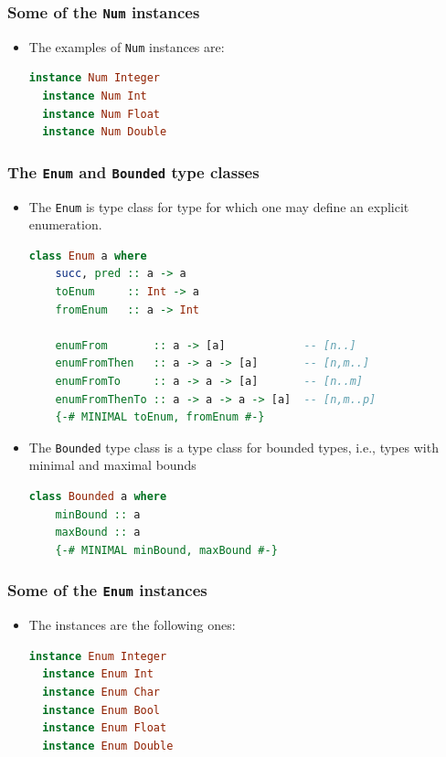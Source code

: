 \documentclass[10pt,pdf,utf8,russian,aspectratio=169]{beamer}
\begin{document}
\begin{frame}[fragile]
  \frametitle{Some of the \verb"Num" instances}

\begin{itemize}
\item The examples of \verb"Num" instances are:

\begin{lstlisting}[language=Haskell]
  instance Num Integer
  instance Num Int
  instance Num Float
  instance Num Double
\end{lstlisting}
\end{itemize}
\end{frame}

\begin{frame}[fragile]
  \frametitle{The \verb"Enum" and \verb"Bounded" type classes}

\begin{itemize}
  \item The \verb"Enum" is type class for type for which one may define an explicit enumeration.
\begin{lstlisting}[language=Haskell]
  class Enum a where
    succ, pred :: a -> a
    toEnum     :: Int -> a
    fromEnum   :: a -> Int

    enumFrom       :: a -> [a]            -- [n..]
    enumFromThen   :: a -> a -> [a]       -- [n,m..]
    enumFromTo     :: a -> a -> [a]       -- [n..m]
    enumFromThenTo :: a -> a -> a -> [a]  -- [n,m..p]
    {-# MINIMAL toEnum, fromEnum #-}
  \end{lstlisting}

\item The \verb"Bounded" type class is a type class for bounded types, i.e., types with minimal and maximal bounds
\begin{lstlisting}[language=Haskell]
  class Bounded a where
    minBound :: a
    maxBound :: a
    {-# MINIMAL minBound, maxBound #-}
  \end{lstlisting}
\end{itemize}
\end{frame}

\begin{frame}[fragile]
  \frametitle{Some of the \verb"Enum" instances}

\begin{itemize}
  \item The instances are the following ones:
\begin{lstlisting}[language=Haskell]
  instance Enum Integer
  instance Enum Int
  instance Enum Char
  instance Enum Bool
  instance Enum Float
  instance Enum Double
\end{lstlisting}
\end{itemize}
\end{frame}
\end{document}
